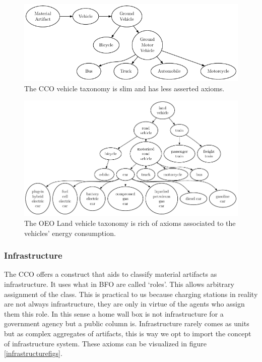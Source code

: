 \begin{figure}[h]
    \centering
    \includegraphics{images/CCOVehicles.pdf}
    \caption{The CCO vehicle taxonomy is slim and has less asserted axioms.}
    \label{ccovectax}
\end{figure}
\begin{figure}[h]
    
    \centering
    \includegraphics{images/OEOLVehicles.pdf}
    \caption{The OEO Land vehicle taxonomy is rich of axioms associated to the vehicles' energy consumption.}
    \label{landvehicletaxoeo}
\end{figure}

\subsubsection{Infrastructure}

The CCO offers a construct that aids to classify material artifacts as
infrastructure. It uses what in BFO are called `roles'. This allows arbitrary
assignment of the class. This is practical to us because charging stations in
reality are not always infrastructure, they are only in virtue of the agents
who assign them this role. In this sense a home wall box is not infrastructure
for a government agency but a public column is. Infrastructure rarely comes as
units but as  complex aggregates of artifacts, this is way we opt to import the
concept of infrastructure system. These axioms can be visualized in figure
\ref{infrastructurefigs}.

